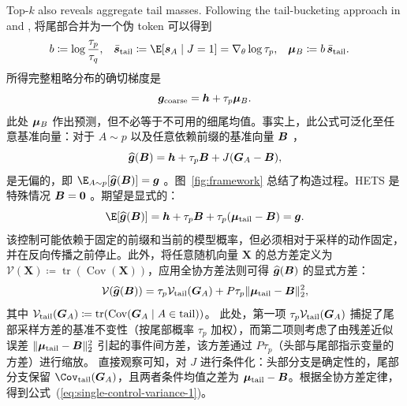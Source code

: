 Top-$k$  also reveals aggregate tail masses.  
Following the tail-bucketing approach in \citet{hubotter2026reinforcement} and \citet{huang2026tail}, 将尾部合并为一个伪 token 可以得到
\begin{equation}
 \begin{aligned}
 b&\coloneqq\log\frac{\tau_p}{\tau_q}, &
 \bar{\bscore}_{\mathrm{tail}}
 &\coloneqq\E[\bscore_A\mid J=1]
   =\nabla_\theta\log\tau_p, &
 \bmean_B&\coloneqq b\,\bar{\bscore}_{\mathrm{tail}}.
 \end{aligned}
 \label{eq:bucket-vector}
\end{equation}
所得完整粗略分布的确切梯度是
\begin{equation}
 \bm{g}_{\mathrm{coarse}}
 =\bm{h}+\tau_p\bm{\mu}_B.
 \label{eq:coarse-gradient}
\end{equation}
此处 $\bm{\mu}_B$ 作出预测，但不必等于不可用的细尾均值。事实上，此公式可泛化至任意基准向量：对于 $A\sim p$ 以及任意依赖前缀的基准向量 $\bm{B}$ ，
\begin{equation}
\widehat{\bm{g}}(\bm{B})=\bm{h}+\tau_p\bm{B}+J(\bm{G}_A-\bm{B}),
\label{eq:residualization}
\end{equation}
是无偏的，即 $\E_{A\sim p}\!\left[\widehat{\bgrad}(\bcontrol)\right]=\bgrad$ 。图~\ref{fig:framework} 总结了构造过程。HETS 是特殊情况 $\bm{B}=\bm0$ 。期望是显式的：
\begin{equation}
 \E[\widehat{\bgrad}(\bcontrol)]
 =\bhead+\tau_p\bcontrol
  +\tau_p(\bmean_{\mathrm{tail}}-\bcontrol)
 =\bgrad.
 \label{eq:residualization-expectation}
\end{equation}
该控制可能依赖于固定的前缀和当前的模型概率，但必须相对于采样的动作固定，并在反向传播之前停止。此外，将任意随机向量 $\bm{X}$ 的总方差定义为 $\mathcal{V}(\bm{X}) \coloneqq \operatorname{tr}(\operatorname{Cov}(\bm{X}))$，应用全协方差法则可得 $\widehat{\bm{g}}(\bm B)$ 的显式方差：
\begin{equation}
\mathcal{V}(\widehat{\bm{g}}(\bm B)) = \tau_p\mathcal{V}_{\mathrm{tail}}(\bm{G}_A)
+ P\tau_p\lVert\bm{\mu}_{\mathrm{tail}}-\bm B\rVert_2^2,
\label{eq:single-control-variance-1}
\end{equation}
其中 $\mathcal{V}_{\mathrm{tail}}(\bm{G}_A) \coloneqq \operatorname{tr}(\operatorname{Cov}(\bm{G}_A \mid A \in \mathrm{tail}))$。
此处，第一项 $\tau_p\mathcal{V}_{\mathrm{tail}}(\bm{G}_A)$ 捕捉了尾部采样方差的基准不变性（按尾部概率 $\tau_p$ 加权），而第二项则考虑了由残差近似误差 $\lVert\bm{\mu}_{\mathrm{tail}}-\bm B\rVert_2^2$ 引起的事件间方差，该方差通过 \(P\tau_p\)（头部与尾部指示变量的方差）进行缩放。
直接观察可知，对 $J$ 进行条件化：头部分支是确定性的，尾部分支保留 $\Cov_{\mathrm{tail}}(\btoken_A)$，且两者条件均值之差为 $\bm{\mu}_{\mathrm{tail}}-\bm B$。根据全协方差定律，得到公式~(\ref{eq:single-control-variance-1})。

